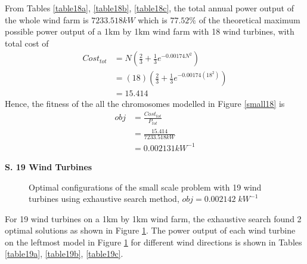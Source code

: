         From Tables \ref{table18a}, \ref{table18b}, \ref{table18c}, the total annual power output of the whole wind farm is $7233.518kW$ which is $77.52\%$ of the theoretical maximum possible power output of a 1km by 1km wind farm with 18 wind turbines, with total cost of
        \begin{align*}
            Cost_{tot}
            &= N\left(\frac{2}{3} + \frac{1}{3}e^{-0.00174N^2}\right) \\
            &= \left(18\right)\left(\frac{2}{3} + \frac{1}{3}e^{-0.00174\left(18^2\right)}\right) \\
            &=15.414
        \end{align*}
        Hence, the fitness of the all the chromosomes modelled in Figure \ref{small18} is
        \begin{align*}
            obj
            &=\frac{Cost_{tot}}{P_{tot}} \\
            &=\frac{15.414}{7233.518kW} \\
            &=0.002131kW^{-1}
        \end{align*}
        
    \textbf{S. 19 Wind Turbines}
        \begin{figure}[H]
            \centering
            \qquad
            \caption{Optimal configurations of the small scale problem with 19 wind turbines using exhaustive search method, $obj=0.002142\;kW^{-1}$}
            \label{small19}
        \end{figure}
        
        For 19 wind turbines on a 1km by 1km wind farm, the exhaustive search found 2 optimal solutions as shown in Figure \ref{small19}. The power output of each wind turbine on the leftmost model in Figure \ref{small19} for different wind directions is shown in Tables \ref{table19a}, \ref{table19b}, \ref{table19c}.
        
